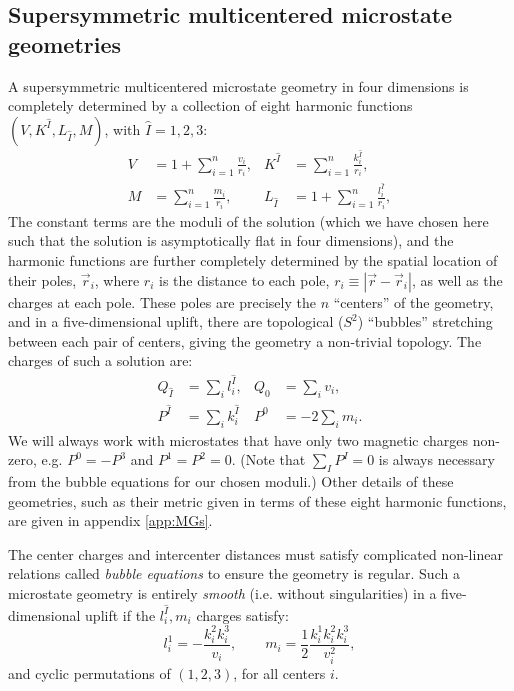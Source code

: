 \documentclass[12pt,a4paper]{article}
\newcommand{\be}{\begin{equation}}
\newcommand{\ee}{\end{equation}}
\begin{document}
\subsection{Supersymmetric multicentered microstate geometries}\label{sec:MGs}
A supersymmetric multicentered microstate geometry in four dimensions is completely determined by a collection of eight harmonic functions $(V,K^{\hat{I}},L_{\hat{I}},M)$, with $\hat{I}=1,2,3$:
\be \label{eq:MGharmfuncs}\begin{aligned}
 V &= 1 + \sum_{i=1}^n \frac{v_i}{r_i}, & K^{\hat{I}} &= \sum_{i=1}^n \frac{k^{\hat{I}}_i}{r_i},\\
 M &= \sum_{i=1}^n \frac{m_i}{r_i}, & L_{\hat{I}} &= 1 + \sum_{i=1}^n \frac{l^{\hat{I}}_i}{r_i},
\end{aligned}\ee
The constant terms are the moduli of the solution (which we have chosen here such that the solution is asymptotically flat in four dimensions), and the harmonic functions are further completely determined by the spatial location of their poles, $\vec{r}_i$, where $r_i$ is the distance to each pole, $r_i\equiv |\vec{r}-\vec{r}_i|$, as well as the charges at each pole. These poles are precisely the $n$ ``centers'' of the geometry, and in a five-dimensional uplift, there are topological ($S^2$) ``bubbles''  stretching between each pair of centers, giving the geometry a non-trivial topology. The charges of such a solution are:
\begin{align}
 Q_{\hat{I}} &= \sum_i l^{\hat{I}}_i, & Q_0 &= \sum_i v_i,\\
 P^{\hat{I}} &= \sum_i k^{\hat{I}}_i & P^0 &= -2 \sum_i m_i.
\end{align}
We will always work with microstates that have only two magnetic charges non-zero, e.g. $P^0 = -P^3$ and $P^1=P^2=0$. (Note that $\sum_I P^I = 0$ is always necessary from the bubble equations for our chosen moduli.) Other details of these geometries, such as their metric given in terms of these eight harmonic functions, are given in appendix \ref{app:MGs}.


The center charges and intercenter distances must satisfy complicated non-linear relations called \emph{bubble equations} to ensure the geometry is regular. Such a microstate geometry is entirely \emph{smooth} (i.e. without singularities) in a five-dimensional uplift if the $l_i^{\hat{I}},m_i$ charges satisfy:
\be \label{eq:MGsmoothness} l_i^1 = -\frac{k^2_ik^3_i}{v_i}, \qquad m_i = \frac12 \frac{k^1_ik^2_ik^3_i}{v_i^2},\ee
and cyclic permutations of $(1,2,3)$, for all centers $i$.
\end{document}
